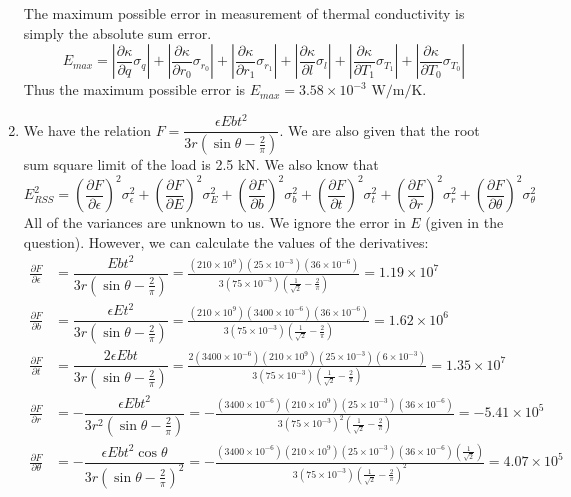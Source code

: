 \documentclass[a4paper, 11pt]{article}
\let\e\epsilon
\begin{document}
\begin{enumerate}[label=(\arabic*),leftmargin=*]
The maximum possible error in measurement of thermal conductivity is simply the absolute sum error.
$$E_{max}=\left|\frac{\partial\kappa}{\partial q}\sigma_{q}\right|+\left|\frac{\partial\kappa}{\partial r_0}\sigma_{r_0}\right|+\left|\frac{\partial\kappa}{\partial r_1}\sigma_{r_1}\right|+\left|\frac{\partial\kappa}{\partial l}\sigma_{l}\right|+\left|\frac{\partial\kappa}{\partial T_1}\sigma_{T_1}\right|+\left|\frac{\partial\kappa}{\partial T_0}\sigma_{T_0}\right|$$
Thus the maximum possible error is $\boxed{E_{max}=3.58\times 10^{-3}\text{ W/m/K}}$.
\newpage
 	\item We have the relation $F=\dfrac{\e Ebt^2}{3r(\sin\theta-\frac{2}{\pi})}$. We are also given that the root sum square limit of the load is 2.5 kN. We also know that 
 	$$E_{RSS}^2=\left(\frac{\partial F}{\partial \e}\right)^2\sigma_{\e}^2+\left(\frac{\partial F}{\partial E}\right)^2\sigma_{E}^2+\left(\frac{\partial F}{\partial b}\right)^2\sigma_{b}^2+\left(\frac{\partial F}{\partial t}\right)^2\sigma_{t}^2+\left(\frac{\partial F}{\partial r}\right)^2\sigma_{r}^2+\left(\frac{\partial F}{\partial \theta}\right)^2\sigma_{\theta}^2$$ 
All of the variances are unknown to us. We ignore the error in $E$ (given in the question). However, we can calculate the values of the derivatives:
\begin{align*}
	\frac{\partial F}{\partial\e}&=\dfrac{ Ebt^2}{3r(\sin\theta-\frac{2}{\pi})}=\frac{(210\times 10^9)(25\times 10^{-3})(36\times 10^{-6})}{3(75\times 10^{-3})(\frac{1}{\sqrt{2}}-\frac{2}{\pi})}=1.19\times 10^7\\
	\frac{\partial F}{\partial b}&=\dfrac{\e Et^2}{3r(\sin\theta-\frac{2}{\pi})}=\frac{(210\times 10^9)(3400\times 10^{-6})(36\times 10^{-6})}{3(75\times 10^{-3})(\frac{1}{\sqrt{2}}-\frac{2}{\pi})}=1.62\times 10^6\\
	\frac{\partial F}{\partial t}&=\dfrac{2\e Ebt}{3r(\sin\theta-\frac{2}{\pi})}=\frac{2(3400\times 10^{-6})(210\times 10^9)(25\times 10^{-3})(6\times 10^{-3})}{3(75\times 10^{-3})(\frac{1}{\sqrt{2}}-\frac{2}{\pi})}=1.35\times 10^7\\
	\frac{\partial F}{\partial r}&=-\dfrac{\e Ebt^2}{3r^2(\sin\theta-\frac{2}{\pi})}=-\frac{(3400\times 10^{-6})(210\times 10^9)(25\times 10^{-3})(36\times 10^{-6})}{3(75\times 10^{-3})^2(\frac{1}{\sqrt{2}}-\frac{2}{\pi})}=-5.41\times 10^5\\
	\frac{\partial F}{\partial\theta}&=-\dfrac{\e Ebt^2\cos\theta}{3r(\sin\theta-\frac{2}{\pi})^2}=-\frac{(3400\times 10^{-6})(210\times 10^9)(25\times 10^{-3})(36\times 10^{-6})(\frac{1}{\sqrt{2}})}{3(75\times 10^{-3})(\frac{1}{\sqrt{2}}-\frac{2}{\pi})^2}=4.07\times 10^5

\end{align*}
\end{enumerate}
\end{document}
